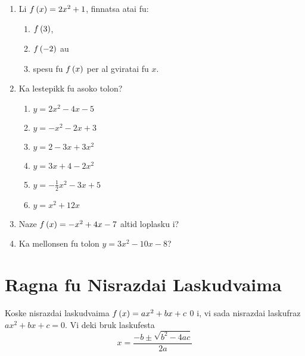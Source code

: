 \begin{exercise}
	\begin{enumerate}
		\item Li \(f\left(x\right) = 2x^2 + 1\), finnatsa atai fu:
		      \begin{enumerate}
			      \item \(f\left(3\right)\),
			      \item \(f\left(-2\right)\) au
			      \item spesu fu \(f\left(x\right)\) per al gviratai fu \(x\).
		      \end{enumerate}
		\item Ka lestepikk fu asoko tolon?
		      \begin{enumerate}
			      \item \(y = 2x^2 - 4x - 5\)
			      \item \(y = -x^2 - 2x + 3\)
			      \item \(y = 2 - 3x + 3x^2\)
			      \item \(y = 3x + 4 - 2x^2\)
			      \item \(y = -\frac{1}{2}x^2 - 3x + 5\)
			      \item \(y = x^2 + 12x\)
		      \end{enumerate}
		\item Naze \(f\left(x\right) = -x^2 + 4x - 7\) altid loplasku i?
		\item Ka mellonsen fu tolon \(y = 3x^2 - 10x - 8\)?
	\end{enumerate}
\end{exercise}

\section{Ragna fu Nisrazdai Laskudvaima}

Koske nisrazdai laskudvaima \(f\left(x\right) = ax^2 + bx + c\) \(0\) i, 
vi sada nisrazdai laskufraz \(ax^2 + bx + c = 0\). Vi deki bruk
laskufesta
\[
  x = \frac{-b \pm \sqrt{b^2 - 4ac}}{2a}
\]
